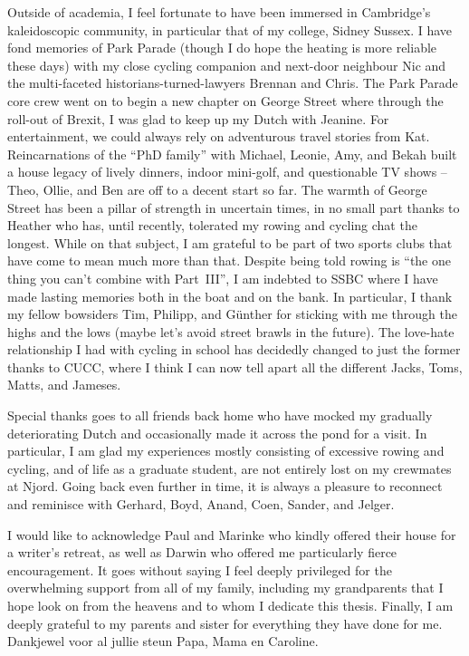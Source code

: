 \begin{acknowledgements}
    Outside of academia, I feel fortunate to have been immersed in Cambridge's kaleidoscopic community, in particular that of my college, Sidney Sussex. I have fond memories of Park Parade (though I do hope the heating is more reliable these days) with my close cycling companion and next-door neighbour Nic and the multi-faceted historians-turned-lawyers Brennan and Chris. The Park Parade core crew went on to begin a new chapter on George Street where through the roll-out of Brexit, I was glad to keep up my Dutch with Jeanine. For entertainment, we could always rely on adventurous travel stories from Kat. Reincarnations of the ``PhD family'' with Michael, Leonie, Amy, and Bekah built a house legacy of lively dinners, indoor mini-golf, and questionable TV shows -- Theo, Ollie, and Ben are off to a decent start so far. The warmth of George Street has been a pillar of strength in uncertain times, in no small part thanks to Heather who has, until recently, tolerated my rowing and cycling chat the longest. While on that subject, I am grateful to be part of two sports clubs that have come to mean much more than that. Despite being told rowing is ``the one thing you can't combine with Part~III'', I am indebted to SSBC where I have made lasting memories both in the boat and on the bank. In particular, I thank my fellow bowsiders Tim, Philipp, and G{\"u}nther for sticking with me through the highs and the lows (maybe let's avoid street brawls in the future). The love-hate relationship I had with cycling in school has decidedly changed to just the former thanks to CUCC, where I think I can now tell apart all the different Jacks, Toms, Matts, and Jameses.
    
    Special thanks goes to all friends back home who have mocked my gradually deteriorating Dutch and occasionally made it across the pond for a visit. In particular, I am glad my experiences mostly consisting of excessive rowing and cycling, and of life as a graduate student, are not entirely lost on my crewmates at Njord. Going back even further in time, it is always a pleasure to reconnect and reminisce with Gerhard, Boyd, Anand, Coen, Sander, and Jelger.
    
    I would like to acknowledge Paul and Marinke who kindly offered their house for a writer's retreat, as well as Darwin who offered me particularly fierce encouragement. It goes without saying I feel deeply privileged for the overwhelming support from all of my family, including my grandparents that I hope look on from the heavens and to whom I dedicate this thesis. Finally, I am deeply grateful to my parents and sister for everything they have done for me. Dankjewel voor al jullie steun Papa, Mama en Caroline.
    
\end{acknowledgements}
